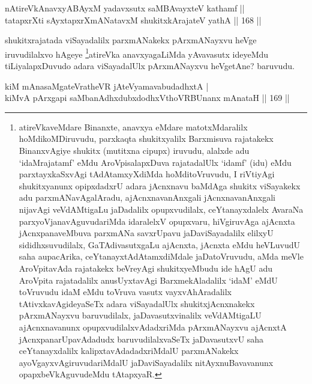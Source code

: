 \begin{shl}
nAtireVkAnavxyABAyxM yadavxsutx saMBAvayxteV kathamf ||  \\
tatapxrXti sAyxtapxrXmANatavxM shukitxkArajateV yathA \hfill||  168 ||  
\end{shl}

\begin{artha}
shukitxrajatada viSayadalilx parxmANakekx pArxmANayxvu heVge iruvudilalxvo hAgeye \footnote{atireVkaveMdare Binanxte, anavxya eMdare matotxMdaralilx hoMdikoMDiruvudu, parxkaqta shukitxyalilx Barxmisuva rajatakekx BinanxvAgiye shukitx (mutitxna cipupx) iruvudu, alalxde adu `idaMrajatamf' eMdu AroVpisalapxDuva rajatadalUlx `idamf' (idu) eMdu parxtayxkaSxvAgi tAdAtamxyXdiMda hoMditoVruvudu, I riVtiyAgi shukitxyanunx opipxdadxrU adara jAcnxnavu baMdAga shukitx viSayakekx adu parxmANavAgalAradu, ajAcnxnavanAnxgali jAcnxnavanAnxgali nijavAgi veVdAMtigaLu jaDadalilx opupxvudilalx, ceYtanayxdalelx AvaraNa parxyoVjanavAguvudariMda idaralelxV opupxvaru, hiVgiruvAga ajAcnxta jAcnxpanaveMbuva parxmANa savxrUpavu jaDaviSayadalilx elilxyU sididhxsuvudilalx, GaTAdivasutxgaLu ajAcnxta, jAcnxta eMdu heVLuvudU saha aupacArika, ceYtanayxtAdAtamxdiMdale jaDatoVruvudu, aMda meVle AroVpitavAda rajatakekx beVreyAgi shukitxyeMbudu ide hAgU adu AroVpita rajatadalilx anusUyxtavAgi BarxmekAladalilx `idaM' eMdU toVruvudu idaM eMdu toVruva vasutx vayxvAhAradalilx tAtivxkavAgideyaSeTx adara viSayadalUlx shukitxjAcnxnakekx pArxmANayxvu baruvudilalx, jaDavasutxvinalilx veVdAMtigaLU ajAcnxnavanunx opupxvudilalxvAdadxriMda pArxmANayxvu ajAcnxtA jAcnxpanarUpavAdadudx baruvudilalxvaSeTx jaDavasutxvU saha ceYtanayxdalilx kalipxtavAdadadxriMdalU parxmANakekx ayoVgayxvAgiruvudariMdalU jaDaviSayadalilx nitAyxnuBavavanunx opapxbeVkAguvudeMdu tAtapxyaR.}atireVka anavxyagaLiMda yAvavasutx ideyeMdu tiLiyalapxDuvudo adara viSayadalUlx pArxmANayxvu heVgetAne? baruvudu.
\end{artha}


\begin{shl}
kiM mAnasaMgateVratheVR jAteVyamavabudadhxtA | \\
kiMvA pArxgapi saMbanAdhxdubxdodhxV\s thoVR\s BUnanx mAnataH \hfill||  169 ||  
\end{shl}

